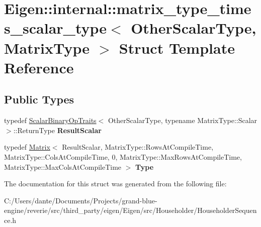 \hypertarget{struct_eigen_1_1internal_1_1matrix__type__times__scalar__type}{}\section{Eigen\+::internal\+::matrix\+\_\+type\+\_\+times\+\_\+scalar\+\_\+type$<$ Other\+Scalar\+Type, Matrix\+Type $>$ Struct Template Reference}
\label{struct_eigen_1_1internal_1_1matrix__type__times__scalar__type}
\subsection*{Public Types}
\begin{DoxyCompactItemize}
\item 
\mbox{\label{struct_eigen_1_1internal_1_1matrix__type__times__scalar__type_a277b4d743057b1d06cf6c260825e7c65}} 
typedef \mbox{\hyperlink{struct_eigen_1_1_scalar_binary_op_traits}{Scalar\+Binary\+Op\+Traits}}$<$ Other\+Scalar\+Type, typename Matrix\+Type\+::\+Scalar $>$\+::Return\+Type {\bfseries Result\+Scalar}
\item 
\mbox{\label{struct_eigen_1_1internal_1_1matrix__type__times__scalar__type_ab6db0eae95f60a6267e95e9d30d17e6b}} 
typedef \mbox{\hyperlink{class_eigen_1_1_matrix}{Matrix}}$<$ Result\+Scalar, Matrix\+Type\+::\+Rows\+At\+Compile\+Time, Matrix\+Type\+::\+Cols\+At\+Compile\+Time, 0, Matrix\+Type\+::\+Max\+Rows\+At\+Compile\+Time, Matrix\+Type\+::\+Max\+Cols\+At\+Compile\+Time $>$ {\bfseries Type}
\end{DoxyCompactItemize}


The documentation for this struct was generated from the following file\+:\begin{DoxyCompactItemize}
\item 
C\+:/\+Users/dante/\+Documents/\+Projects/grand-\/blue-\/engine/reverie/src/third\+\_\+party/eigen/\+Eigen/src/\+Householder/Householder\+Sequence.\+h\end{DoxyCompactItemize}
